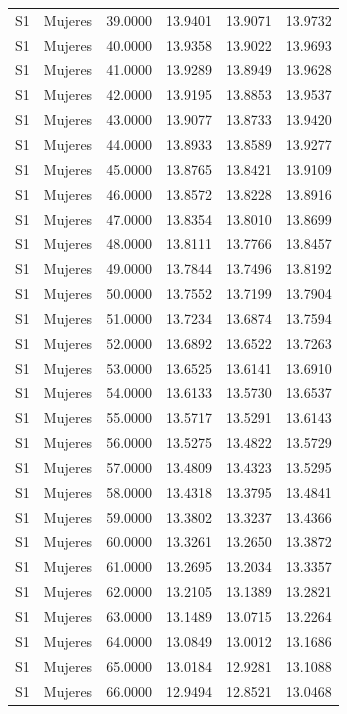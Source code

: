 \begin{longtable}{llrrrr}
S1 & Mujeres & 39.0000 & 13.9401 & 13.9071 & 13.9732 \\
S1 & Mujeres & 40.0000 & 13.9358 & 13.9022 & 13.9693 \\
S1 & Mujeres & 41.0000 & 13.9289 & 13.8949 & 13.9628 \\
S1 & Mujeres & 42.0000 & 13.9195 & 13.8853 & 13.9537 \\
S1 & Mujeres & 43.0000 & 13.9077 & 13.8733 & 13.9420 \\
S1 & Mujeres & 44.0000 & 13.8933 & 13.8589 & 13.9277 \\
S1 & Mujeres & 45.0000 & 13.8765 & 13.8421 & 13.9109 \\
S1 & Mujeres & 46.0000 & 13.8572 & 13.8228 & 13.8916 \\
S1 & Mujeres & 47.0000 & 13.8354 & 13.8010 & 13.8699 \\
S1 & Mujeres & 48.0000 & 13.8111 & 13.7766 & 13.8457 \\
S1 & Mujeres & 49.0000 & 13.7844 & 13.7496 & 13.8192 \\
S1 & Mujeres & 50.0000 & 13.7552 & 13.7199 & 13.7904 \\
S1 & Mujeres & 51.0000 & 13.7234 & 13.6874 & 13.7594 \\
S1 & Mujeres & 52.0000 & 13.6892 & 13.6522 & 13.7263 \\
S1 & Mujeres & 53.0000 & 13.6525 & 13.6141 & 13.6910 \\
S1 & Mujeres & 54.0000 & 13.6133 & 13.5730 & 13.6537 \\
S1 & Mujeres & 55.0000 & 13.5717 & 13.5291 & 13.6143 \\
S1 & Mujeres & 56.0000 & 13.5275 & 13.4822 & 13.5729 \\
S1 & Mujeres & 57.0000 & 13.4809 & 13.4323 & 13.5295 \\
S1 & Mujeres & 58.0000 & 13.4318 & 13.3795 & 13.4841 \\
S1 & Mujeres & 59.0000 & 13.3802 & 13.3237 & 13.4366 \\
S1 & Mujeres & 60.0000 & 13.3261 & 13.2650 & 13.3872 \\
S1 & Mujeres & 61.0000 & 13.2695 & 13.2034 & 13.3357 \\
S1 & Mujeres & 62.0000 & 13.2105 & 13.1389 & 13.2821 \\
S1 & Mujeres & 63.0000 & 13.1489 & 13.0715 & 13.2264 \\
S1 & Mujeres & 64.0000 & 13.0849 & 13.0012 & 13.1686 \\
S1 & Mujeres & 65.0000 & 13.0184 & 12.9281 & 13.1088 \\
S1 & Mujeres & 66.0000 & 12.9494 & 12.8521 & 13.0468 \\

\end{longtable}
